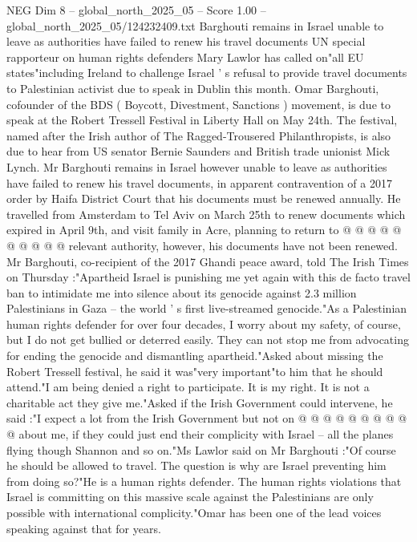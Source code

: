 \begin{textsample}{NEG Dim 8 – global\_north\_2025\_05 – Score 1.00 – global\_north\_2025\_05/124232409.txt}  \label{ex:f8_neg_416}
Barghouti remains in Israel unable to leave as authorities have failed to renew his travel documents UN special rapporteur on human rights defenders Mary Lawlor has called on"all EU states"including Ireland to challenge Israel ' s refusal to provide travel documents to Palestinian activist due to speak in Dublin this month.
Omar Barghouti, cofounder of the BDS ( Boycott, Divestment, Sanctions ) movement, is due to speak at the Robert Tressell Festival in Liberty Hall on May 24th.
The festival, named after the Irish author of The Ragged-Trousered Philanthropists, is also due to hear from US senator Bernie Saunders and British trade unionist Mick Lynch.
Mr Barghouti remains in Israel however unable to leave as authorities have failed to renew his travel documents, in apparent contravention of a 2017 order by Haifa District Court that his documents must be renewed annually.
He travelled from Amsterdam to Tel Aviv on March 25th to renew documents which expired in April 9th, and visit family in Acre, planning to return to @ @ @ @ @ @ @ @ @ @ relevant authority, however, his documents have not been renewed.
Mr Barghouti, co-recipient of the 2017 Ghandi peace award, told The Irish Times on Thursday :"Apartheid Israel is punishing me yet again with this de facto travel ban to intimidate me into silence about its genocide against 2.3 million Palestinians in Gaza -- the world ' s first live-streamed genocide."As a Palestinian human rights defender for over four decades, I worry about my safety, of course, but I do not get bullied or deterred easily.
They can not stop me from advocating for ending the genocide and dismantling apartheid."Asked about missing the Robert Tressell festival, he said it was"very important"to him that he should attend."I am being denied a right to participate.
It is my right.
It is not a charitable act they give me."Asked if the Irish Government could intervene, he said :"I expect a lot from the Irish Government but not on @ @ @ @ @ @ @ @ @ @ about me, if they could just end their complicity with Israel -- all the planes flying though Shannon and so on."Ms Lawlor said on Mr Barghouti :"Of course he should be allowed to travel.
The question is why are Israel preventing him from doing so?"He is a human rights defender.
The human rights violations that Israel is committing on this massive scale against the Palestinians are only possible with international complicity."Omar has been one of the lead voices speaking against that for years.

\end{textsample}
